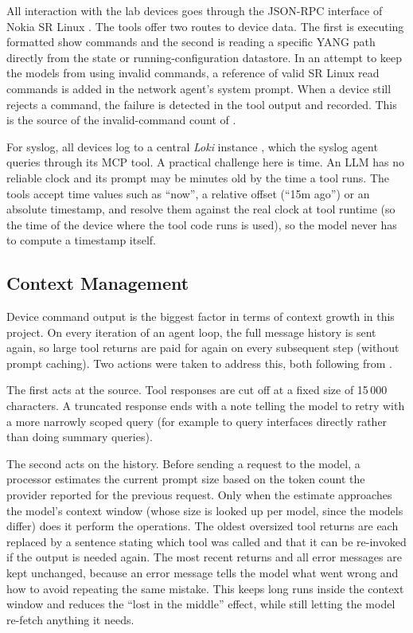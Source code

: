 All interaction with the lab devices goes through the JSON-RPC interface of Nokia SR Linux
\parencite{srlinux_jsonrpc}. The tools offer two routes to device
data. The first is executing formatted show commands and the second is reading a specific YANG path directly from the state
or running-configuration datastore. In an attempt to keep
the models from using invalid commands, a reference of valid SR Linux read
commands is added in the network agent's system prompt. When a device still rejects a command, the
failure is detected in the tool output and recorded. This is the source of the invalid-command count of
.

For syslog, all devices log to a central \emph{Loki} instance \parencite{grafana_loki}, which the syslog
agent queries through its MCP tool. A practical challenge here is time. An LLM has no reliable clock and its
prompt may be minutes old by the time a tool runs. The tools accept time values such as
\enquote{now}, a relative offset (\enquote{15m ago}) or an absolute timestamp, and resolve them against the
real clock at tool runtime (so the time of the device where the tool code runs is used), so the model never has to compute a timestamp itself.

\subsection{Context Management}
\label{sec:impl-context}
Device command output is the biggest factor in terms of context growth in this project. On every iteration of an agent loop, the full
message history is sent again, so large tool returns are paid for again on every subsequent step (without prompt caching).
Two actions were taken to address this, both following from .

The first acts at the source. Tool responses are cut off at a fixed size of 15\,000 characters. A
truncated response ends with a note telling the model to retry with a more narrowly scoped query
(for example to query interfaces directly rather than doing summary queries).

The second acts on the history. Before sending a request to the model, a processor estimates the current prompt size
based on the token count the provider reported for the previous request. Only when the estimate
approaches the model's context window (whose size is looked up per model, since the models differ) does it perform the operations. The oldest oversized tool returns are each replaced by a sentence stating
which tool was called and that it can be re-invoked if the output is needed again. The most recent returns
and all error messages are kept unchanged, because an error message tells the model what went wrong and
how to avoid repeating the same mistake. This keeps long runs inside the context window and reduces the
\enquote{lost in the middle} effect, while still letting the model re-fetch anything it needs.

